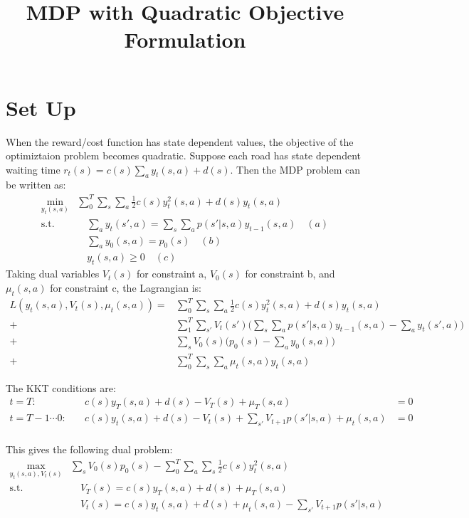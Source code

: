 \documentclass{jhwhw}
\title{MDP with Quadratic Objective Formulation}
\newcommand{\half}{\frac{1}{2}}
\begin{document}
\section{Set Up}
When the reward/cost function has state dependent values, the objective of the optimiztaion problem becomes quadratic. Suppose each road has state dependent waiting time $r_t(s) =  c(s)\sum_ay_t(s,a) + d(s) $. 
Then the MDP problem can be written as: 
\begin{equation}
\begin{aligned}
\min_{y_t(s,a)}&  \sum_0^T\sum_s \sum_a \half c(s)y_t^2(s,a) + d(s) y_t(s,a) \\
\text{s.t.} & \quad \sum_a y_t(s',a) = \sum_s\sum_ap(s'|s,a)y_{t-1}(s,a) \quad (a)\\
& \quad \sum_ay_0(s,a) = p_0(s) \quad (b)\\
& \quad y_t(s,a) \geq 0 \quad (c)
\end{aligned}
\end{equation}
Taking dual variables $V_t(s) $ for constraint a, $V_0(s) $ for constraint b, and $\mu_t(s,a) $ for constraint c, the Lagrangian is:
\begin{equation}
\begin{aligned}
L(y_t(s,a), V_t(s), \mu_t(s,a)) = &\sum_0^T\sum_s \sum_a \half c(s)y_t^2(s,a) + d(s) y_t(s,a) \\
+ & \sum_1^T\sum_{s'} V_t(s')\Big(\sum_s\sum_ap(s'|s,a)y_{t-1}(s,a) - \sum_a y_t(s',a)\Big) \\
+ & \sum_s V_0(s)\Big( p_0(s) - \sum_ay_0(s,a) \Big) \\
+ &  \sum_0^T\sum_s \sum_a \mu_t(s,a) y_t(s,a)
\end{aligned}
\end{equation}

The KKT conditions are: 
\begin{equation}
\begin{aligned} 
t = T: & \quad c(s)y_T(s,a) + d(s)- V_T(s) + \mu_T(s,a) & = 0 \\
t = T-1 \cdots 0: & \quad c(s) y_t(s,a)  + d(s)- V_t(s)  + \sum_{s'}V_{t+1}p(s'|s,a) + \mu_t(s,a) &= 0 \\
\end{aligned}
\end{equation}

This gives the following dual problem:
\begin{equation}
\begin{aligned}
\max_{y_t(s,a), V_t(s)} & \sum_s V_0(s)p_0(s) - \sum_0^T\sum_a\sum_s \half c(s)y^2_t(s,a) \\
\text{s.t.} & \quad V_T(s) = c(s)y_T(s,a) + d(s) + \mu_T(s,a) \\
& \quad V_t(s) = c(s)y_t(s,a) + d(s) + \mu_t(s,a)  - \sum_{s'}V_{t+1} p(s'|s,a)\\
\end{aligned}
\end{equation}
\end{document}
